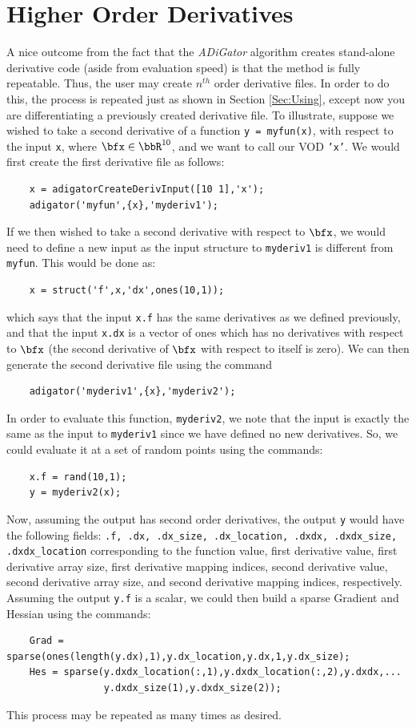 \documentclass[10pt,pdftex]{article}
\begin{document}
\section{Higher Order Derivatives}
A nice outcome from the fact that the \emph{ADiGator} algorithm creates stand-alone derivative code (aside from evaluation speed) is that the method is fully repeatable. Thus, the user may create $n^{th}$ order derivative files. In order to do this, the process is repeated just as shown in Section \ref{Sec:Using}, except now you are differentiating a previously created derivative file. To illustrate, suppose we wished to take a second derivative of a function \texttt{y = myfun(x)}, with respect to the input \texttt{x}, where $\bfx \in \bbR^{10}$, and we want to call our VOD \texttt{'x'}. We would first create the first derivative file as follows:
\begin{verbatim}
    x = adigatorCreateDerivInput([10 1],'x');
    adigator('myfun',{x},'myderiv1');
\end{verbatim}
If we then wished to take a second derivative with respect to $\bfx$, we would need to define a new input as the input structure to \texttt{myderiv1} is different from \texttt{myfun}. This would be done as:
\begin{verbatim}
    x = struct('f',x,'dx',ones(10,1));
\end{verbatim}
which says that the input \texttt{x.f} has the same derivatives as we defined previously, and that the input \texttt{x.dx} is a vector of ones which has no derivatives with respect to $\bfx$ (the second derivative of $\bfx$ with respect to itself is zero). We can then generate the second derivative file using the command
\begin{verbatim}
    adigator('myderiv1',{x},'myderiv2');
\end{verbatim}
In order to evaluate this function, \texttt{myderiv2}, we note that the input is exactly the same as the input to \texttt{myderiv1} since we have defined no new derivatives. So, we could evaluate it at a set of random points using the commands:
\begin{verbatim}
    x.f = rand(10,1);
    y = myderiv2(x);
\end{verbatim}
Now, assuming the output has second order derivatives, the output \texttt{y} would have the following fields: \texttt{.f, .dx, .dx\_size, .dx\_location, .dxdx, .dxdx\_size, .dxdx\_location} corresponding to the function value, first derivative value, first derivative array size, first derivative mapping indices, second derivative value, second derivative array size, and second derivative mapping indices, respectively. Assuming the output \texttt{y.f} is a scalar, we could then build a sparse Gradient and Hessian using the commands:
\begin{verbatim}
    Grad = sparse(ones(length(y.dx),1),y.dx_location,y.dx,1,y.dx_size);
    Hes = sparse(y.dxdx_location(:,1),y.dxdx_location(:,2),y.dxdx,...
                 y.dxdx_size(1),y.dxdx_size(2));
\end{verbatim}
This process may be repeated as many times as desired.
\end{document}
